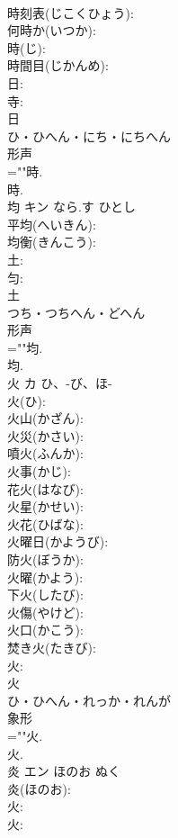\documentclass[8pt]{extreport}
\begin{document}
\begin{CJK}{UTF8}{min}
\\	時刻表(じこくひょう): 
\\	何時か(いつか): 
\\	時(じ): 
\\	時間目(じかんめ): 
\\	日: 
\\	寺: 
\\	日	
\\	ひ・ひへん・にち・にちへん	
\\	形声 
\\	=""時.
\\	時.
\\	均	キン	なら.す	ひとし	
\\	平均(へいきん): 
\\	均衡(きんこう): 
\\	土: 
\\	匀: 
\\	土	
\\	つち・つちへん・どへん	
\\	形声 
\\	=""均.
\\	均.
\\	火	カ	ひ、-び、ほ-		
\\	火(ひ): 
\\	火山(かざん): 
\\	火災(かさい): 
\\	噴火(ふんか): 
\\	火事(かじ): 
\\	花火(はなび): 
\\	火星(かせい): 
\\	火花(ひばな): 
\\	火曜日(かようび): 
\\	防火(ぼうか): 
\\	火曜(かよう): 
\\	下火(したび): 
\\	火傷(やけど): 
\\	火口(かこう): 
\\	焚き火(たきび): 
\\	火: 
\\	火	
\\	ひ・ひへん・れっか・れんが	
\\	象形 
\\	=""火.
\\	火.
\\	炎	エン	ほのお	ぬく	
\\	炎(ほのお): 
\\	火: 
\\	火: 

\end{CJK}
\end{document}
